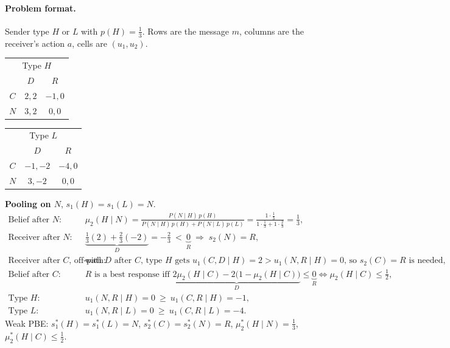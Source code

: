 \documentclass{article}
\begin{document}
\paragraph{Problem format.}
Sender type $H$ or $L$ with $p(H)=\tfrac13$. Rows are the message $m$, columns are the receiver's action $a$, cells are $(u_1,u_2)$.
\begin{center}
\begin{tabular}{c|cc}
\multicolumn{3}{c}{Type $H$}\\
 & $D$ & $R$ \\
\hline
$C$ & $2,2$ & $-1,0$ \\
$N$ & $3,2$ & $0,0$ \\
\end{tabular}
\qquad\qquad
\begin{tabular}{c|cc}
\multicolumn{3}{c}{Type $L$}\\
 & $D$ & $R$ \\
\hline
$C$ & $-1,-2$ & $-4,0$ \\
$N$ & $3,-2$ & $0,0$ \\
\end{tabular}
\end{center}

\textbf{Pooling on $N$}, $s_1(H)=s_1(L)=N$.
\begin{align*}
    \text{Belief after }N:&\quad \mu_2(H\mid N)=\frac{P(N\mid H)\,p(H)}{P(N\mid H)\,p(H)+P(N\mid L)\,p(L)}=\frac{1\cdot\frac13}{1\cdot\frac13+1\cdot\frac23}=\tfrac13,\\
    \text{Receiver after }N:&\quad \underbrace{\tfrac13(2)+\tfrac23(-2)}_{D}=-\tfrac23\ <\ \underbrace{0}_{R}\;\Rightarrow\;s_2(N)=R,\\
    \text{Receiver after }C\text{, off-path}:&\quad \text{with }D\text{ after }C\text{, type }H\text{ gets }u_1(C,D\mid H)=2>u_1(N,R\mid H)=0\text{, so }s_2(C)=R\text{ is needed},\\
    \text{Belief after }C:&\quad R\text{ is a best response iff }\underbrace{2\mu_2(H\mid C)-2\big(1-\mu_2(H\mid C)\big)}_{D}\le\underbrace{0}_{R}\iff\mu_2(H\mid C)\le\tfrac12,\\
    \text{Type }H:&\quad u_1(N,R\mid H)=0\ \ge\ u_1(C,R\mid H)=-1,\\
    \text{Type }L:&\quad u_1(N,R\mid L)=0\ \ge\ u_1(C,R\mid L)=-4.
\end{align*}
Weak PBE: $s_1^*(H)=s_1^*(L)=N$, $s_2^*(C)=s_2^*(N)=R$, $\mu_2^*(H\mid N)=\tfrac13$, $\mu_2^*(H\mid C)\le\tfrac12$.
\end{document}
